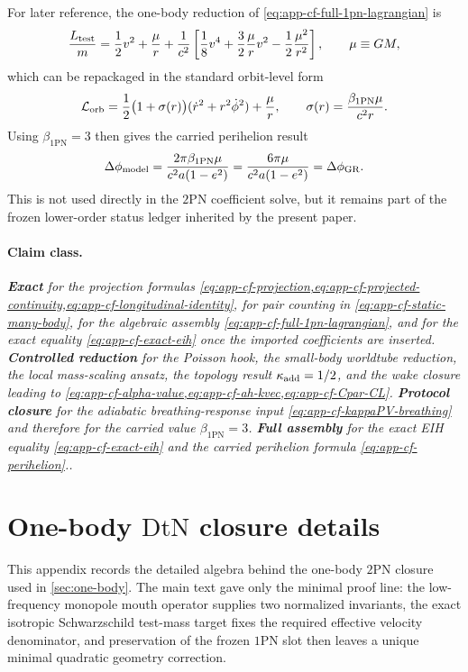 \documentclass[11pt]{article}
\newcommand{\OnePN}{\mathrm{1PN}}
\newcommand{\TwoPN}{\mathrm{2PN}}
\newcommand{\DtN}{\mathrm{DtN}}
\newcommand{\Exact}{\textbf{Exact}}
\newcommand{\Controlled}{\textbf{Controlled reduction}}
\newcommand{\Protocol}{\textbf{Protocol closure}}
\newcommand{\FullMatch}{\textbf{Full assembly}}
\newcommand{\claimclass}[1]{\paragraph{Claim class.}\emph{#1.}}
\begin{document}
For later reference, the one-body reduction of
\cref{eq:app-cf-full-1pn-lagrangian} is
\begin{equation}
\frac{L_{\rm test}}{m}
=
\frac12v^2+\frac{\mu}{r}
+\frac{1}{c^2}
\left[
\frac18v^4+\frac32\frac{\mu}{r}v^2-\frac12\frac{\mu^2}{r^2}
\right],
\qquad
\mu\equiv GM,
\label{eq:app-cf-test-mass-1pn}
\end{equation}
which can be repackaged in the standard orbit-level form
\begin{equation}
\mathcal L_{\rm orb}
=
\frac12\bigl(1+\sigma(r)\bigr)(\dot r^2+r^2\dot\phi^2)+\frac{\mu}{r},
\qquad
\sigma(r)=\frac{\beta_{\OnePN}\mu}{c^2r}.
\label{eq:app-cf-orbit-form}
\end{equation}
Using \(\beta_{\OnePN}=3\) then gives the carried perihelion result
\begin{equation}
\Delta\phi_{\rm model}
=
\frac{2\pi\beta_{\OnePN}\mu}{c^2a(1-e^2)}
=
\frac{6\pi\mu}{c^2a(1-e^2)}
=\Delta\phi_{\rm GR}.
\label{eq:app-cf-perihelion}
\end{equation}
This is not used directly in the \(\TwoPN\) coefficient solve, but it remains part of the
frozen lower-order status ledger inherited by the present paper.

\claimclass{\Exact{} for the projection formulas
\cref{eq:app-cf-projection,eq:app-cf-projected-continuity,eq:app-cf-longitudinal-identity},
for pair counting in
\cref{eq:app-cf-static-many-body},
for the algebraic assembly
\cref{eq:app-cf-full-1pn-lagrangian},
and for the exact equality
\cref{eq:app-cf-exact-eih} once the imported coefficients are inserted.
\Controlled{} for the Poisson hook, the small-body worldtube reduction, the local
mass-scaling ansatz, the topology result \(\kappa_{\rm add}=1/2\), and the wake closure
leading to
\cref{eq:app-cf-alpha-value,eq:app-cf-ah-kvec,eq:app-cf-Cpar-CL}.
\Protocol{} for the adiabatic breathing-response input
\cref{eq:app-cf-kappaPV-breathing} and therefore for the carried value
\(\beta_{\OnePN}=3\).
\FullMatch{} for the exact EIH equality
\cref{eq:app-cf-exact-eih} and the carried perihelion formula
\cref{eq:app-cf-perihelion}.}

\section{One-body \texorpdfstring{$\DtN$}{DtN} closure details}
\label{app:one-body-dtn}

This appendix records the detailed algebra behind the one-body \(\TwoPN\)
closure used in \cref{sec:one-body}.  The main text gave only the minimal proof
line: the low-frequency monopole mouth operator supplies two normalized invariants,
the exact isotropic Schwarzschild test-mass target fixes the required effective
velocity denominator, and preservation of the frozen \(\OnePN\) slot then leaves a
unique minimal quadratic geometry correction.
\end{document}
